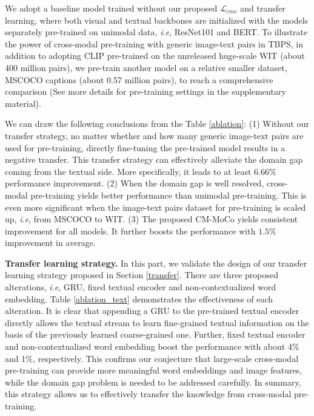 \documentclass{bmvc2k}
\def\ie{\emph{i.e}\bmvaOneDot}
\newcommand{\revision}[1]{#1}
\newcommand{\statement}[1]{\noindent\textbf{#1}}
\begin{document}
We adopt a baseline model trained without our proposed $\mathcal{L}_{cmc}$ and transfer learning, where both visual and textual backbones are initialized with the models separately pre-trained on unimodal data, \ie, ResNet101 and BERT.  
To illustrate the power of cross-modal pre-training with generic image-text pairs in TBPS, in addition to adopting CLIP pre-trained on the unreleased huge-scale WIT \cite{radford2021clip} (about 400 million pairs), we pre-train another model on a relative smaller dataset, MSCOCO captions \cite{lin2014coco} (about 0.57 million pairs), to reach a comprehensive comparison (See more details for pre-training settings in the supplementary material). 

We can draw the following conclusions from the Table \ref{ablation}: 
(1) Without our transfer strategy, no matter whether and how many generic image-text pairs are used for pre-training, directly fine-tuning the pre-trained model results in a negative transfer. \revision{This transfer strategy can effectively alleviate the domain gap coming from the textual side}. More specifically, it leads to at least $6.66\%$ performance improvement.
(2) \revision{When the domain gap is well resolved, cross-modal pre-training yields better performance than unimodal pre-training.} This is even more significant when the image-text pairs dataset for pre-training is scaled up, \ie, from MSCOCO to WIT. 
(3) The proposed CM-MoCo yields consistent improvement for all models. It further boosts the performance with $1.5\%$ improvement in average. 

\newpage
\statement{Transfer learning strategy.} In this part, we validate the design of our transfer learning strategy proposed in Section \ref{transfer}. 
There are three proposed alterations, \ie, GRU, fixed textual encoder and non-contextualized word embedding. 
Table \ref{ablation_text} demonstrates the effectiveness of each alteration. 
It is clear that appending a GRU to the pre-trained textual encoder directly allows the textual stream to learn fine-grained textual information on the basis of the previously learned coarse-grained one. 
Further, fixed textual encoder and non-contextualized word embedding boost the performance with about 4\% and 1\%, respectively.
\revision{This confirms our conjecture that large-scale cross-modal pre-training can provide more meaningful word embeddings and image features, while the domain gap problem is needed to be addressed carefully.}
In summary, this strategy allows us to effectively transfer the knowledge from cross-modal pre-training. 
\end{document}
